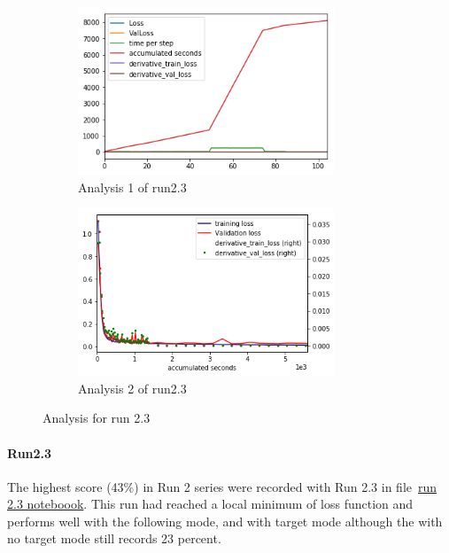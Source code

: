 \documentclass[paper=a4, fontsize=11pt]{scrartcl} %
\numberwithin{equation}{section} %
\numberwithin{figure}{section} %
\numberwithin{table}{section} %
\begin{document}
\begin{figure}
   \begin{subfigure}{0.45\textwidth}
   \includegraphics[width=0.9\linewidth, height=5cm]{./imgs/analysis_0_2_3.png} 
   \caption{Analysis 1 of run2.3}
   \label{fig:subAnalysisRun23}
   \end{subfigure}
   \begin{subfigure}{0.45\textwidth}
   \includegraphics[width=0.9\linewidth, height=5cm]{./imgs/analysis_0_2_3plot.png}
   \caption{Analysis 2 of run2.3}
   \label{fig:subAnalysisRun23plot}
   \end{subfigure}
	
   \caption{Analysis for run 2.3}
   \label{fig:AnalysisRun23}
\end{figure}
\paragraph{Run2.3}\label{rubric70}
The highest score (43\%) in Run 2 series were recorded with Run 2.3 in file~\href{run:../code/model_training.ipynb}{run 2.3 noteboook}. This run had reached a  local minimum of loss function and performs well with the following mode, and with target mode although the with no target mode still records 23 percent.
\end{document}
